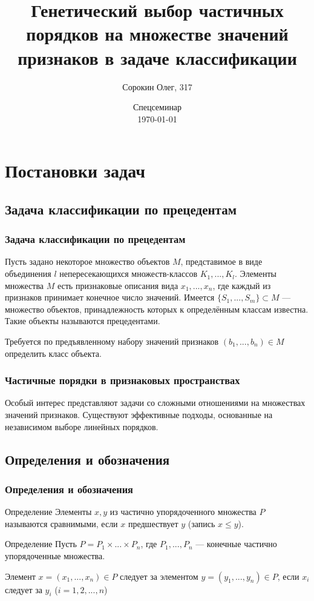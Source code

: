 \documentclass[
	11pt,
]{beamer}
\title[Генетический подход для частичных порядков]{Генетический выбор частичных порядков на множестве значений признаков в задаче классификации}
\author[Сорокин Олег, 317 группа ММП ВМК МГУ]{Сорокин Олег, 317}
\institute[ММП ВМК МГУ]{ММП ВМК МГУ}
\date[\today]{Спецсеминар \\ \today}
\begin{document}
\begin{frame}
	\titlepage
\end{frame}

\begin{frame}
	\tableofcontents
\end{frame}

\section{Постановки задач}

\subsection{Задача классификации по прецедентам}

\begin{frame}
	\frametitle{Задача классификации по прецедентам}
	
	Пусть задано некоторое множество объектов $M$, представимое в виде объединения $l$ непересекающихся множеств-классов $K_1, ..., K_l$. Элементы множества $M$ есть признаковые описания вида $x_1, ..., x_n$, где каждый из признаков принимает конечное число значений. Имеется $\{S_1, ..., S_m\} \subset M$ — множество объектов, принадлежность которых к определённым классам известна. Такие объекты называются прецедентами.
	
	\bigskip

	Требуется по предъявленному набору значений признаков $(b_1, ..., b_n) \in M$ определить класс объекта.

\end{frame}

\begin{frame}
	\frametitle{Частичные порядки в признаковых пространствах}
	
	Особый интерес представляют задачи со сложными отношениями на множествах значений признаков. Существуют эффективные подходы, основанные на независимом выборе линейных порядков.

\end{frame}

\subsection{Определения и обозначения}

\begin{frame}
	\frametitle{Определения и обозначения}
	
	\begin{block}{Определение}
		Элементы $x, y$ из частично упорядоченного множества $P$ называются сравнимыми, если $x$ предшествует $y$ (запись $x \leq y$).
	\end{block}

	\begin{block}{Определение}
		Пусть $P = P_1 \times ... \times P_n$, где $P_1, ..., P_n$ — конечные частично упорядоченные множества.

		Элемент $x = (x_1, ..., x_n) \in P$ следует за элементом $y = (y_1, ..., y_n) \in P$, если $x_i$ следует за $y_i$ ($i = 1, 2, ..., n$)
	\end{block}

\end{frame}
\end{document}
